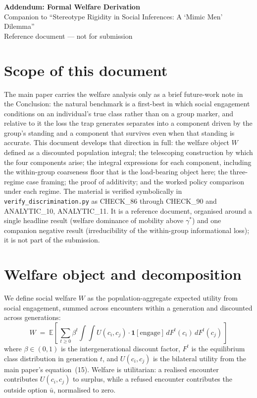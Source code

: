 \documentclass[12pt,a4paper]{article}
\theoremstyle{definition}
\numberwithin{proposition}{section}
\newcommand{\E}{\mathbb{E}}
\begin{document}
\begin{center}
{\Large\bfseries Addendum: Formal Welfare Derivation}\\[0.4em]
{\normalsize Companion to ``Stereotype Rigidity in Social Inferences:
A `Mimic Men' Dilemma''}\\[0.5em]
{\normalsize Reference document --- not for submission}\\[1em]
\end{center}

\section*{Scope of this document}

The main paper carries the welfare analysis only as a brief future-work
note in the Conclusion: the natural benchmark is a first-best in which
social engagement conditions on an individual's true class rather than
on a group marker, and relative to it the loss the trap generates
separates into a component driven by the group's standing and a
component that survives even when that standing is accurate. This
document develops that direction in full: the welfare object $W$
defined as a discounted population integral; the telescoping
construction by which the four components arise; the integral
expressions for each component, including the within-group coarseness
floor that is the load-bearing object here; the three-regime case
framing; the proof of additivity; and the worked policy comparison
under each regime. The material is verified symbolically in
\texttt{verify\_discrimination.py} as CHECK\_86 through CHECK\_90
and ANALYTIC\_10, ANALYTIC\_11. It is a reference document, organised
around a single headline result (welfare dominance of mobility above
$\gamma^*$) and one companion negative result (irreducibility of the
within-group informational loss); it is not part of the submission.

\section{Welfare object and decomposition}
\label{sec:welfare-object}

We define social welfare $W$ as the population-aggregate expected
utility from social engagement, summed across encounters within a
generation and discounted across generations:
\begin{equation}
  W \;=\; \E\!\left[\,
  \sum_{t \geq 0} \beta^t
  \int\!\!\!\int U(c_i, c_j) \cdot \mathbf{1}\!\left[\text{engage}\right]
  \, dF^t(c_i)\, dF^t(c_j)
  \,\right]
  \label{eq:welfare-W}
\end{equation}
where $\beta \in (0,1)$ is the intergenerational discount factor,
$F^t$ is the equilibrium class distribution in generation $t$, and
$U(c_i, c_j)$ is the bilateral utility from the main paper's
equation~(15). Welfare is utilitarian: a realised encounter
contributes $U(c_i, c_j)$ to surplus, while a refused encounter
contributes the outside option $\bar{u}$, normalised to zero.
\end{document}
